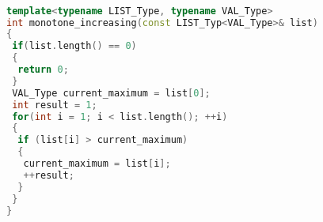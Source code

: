 \vspace{-1em}
\begin{lstlisting}[caption={%
\emblink{\#lst--maxima--\thelstlisting.pgvm-pdf}{Polymorphic Operators and Overloading}},
  language = C++, numbers = none, escapechar = !,label={lst:maxima},
    basicstyle = \ttfamily\bfseries\footnotesize, linewidth = \linewidth]

template<typename LIST_Type, typename VAL_Type>
int monotone_increasing(const LIST_Typ<VAL_Type>& list)
{
 if(list.length() == 0)
 {
  return 0;
 }
 VAL_Type current_maximum = list[0];
 int result = 1;
 for(int i = 1; i < list.length(); ++i)
 {
  if (list[i] > current_maximum)
  {
   current_maximum = list[i];
   ++result;
  }
 }
}
\end{lstlisting}

